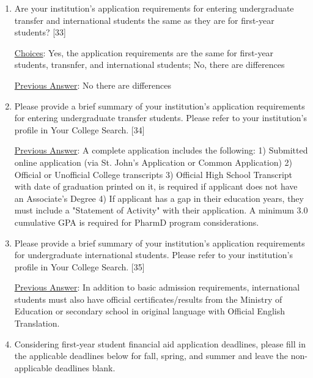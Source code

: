 \documentclass[12 pt, a4paper]{article}
\begin{document}
\begin{Form}
\begin{enumerate}
\TextField[width = 6 in,multiline, name=90066]{} \medskip

\item Are your institution's application requirements for entering undergraduate transfer and international students the same as they are for first-year students? [33] \medskip

\underline{Choices}: Yes, the application requirements are the same for first-year students, transnfer, and international students; No, there are differences \medskip

\underline{Previous Answer}: No there are differences\medskip

\TextField[width = 6 in,multiline, name=90067]{} \medskip


\item Please provide a brief summary of your institution's application requirements for entering undergraduate transfer students. Please refer to your institution's profile in Your College Search. [34] \medskip

\underline{Previous Answer}: A complete application includes the following: 1) Submitted online application (via St. John's Application or Common Application) 2) Official or Unofficial College transcripts 3) Official High School Transcript with date of graduation printed on it, is required if applicant does not have an Associate's Degree 4) If applicant has a gap in their education years, they must include a "Statement of Activity" with their application. A minimum 3.0 cumulative GPA is required for PharmD program considerations.\medskip

\TextField[width = 6 in,multiline, name=90068]{} \medskip

\newpage


\item Please provide a brief summary of your institution's application requirements for undergraduate international students. Please refer to your institution's profile in Your College Search. [35] \medskip

\underline{Previous Answer}: In addition to basic admission requirements, international students must also have official certificates/results from the Ministry of Education or secondary school in original language with Official English Translation.\medskip

\TextField[width = 6 in,multiline, name=90069]{} \medskip


\item Considering first-year student financial aid application deadlines, please fill in the applicable deadlines below for fall, spring, and summer and leave the non-applicable deadlines blank.


\end{enumerate}
\end{Form}
\end{document}
